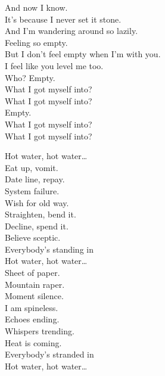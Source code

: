 And now I know. \\
It's because I never set it stone. \\
And I'm wandering around so lazily. \\
Feeling so empty. \\

But I don't feel empty when I'm with you. \\
I feel like you level me too. \\
Who? Empty. \\

What I got myself into? \\
What I got myself into? \\
Empty. \\

What I got myself into? \\
What I got myself into? \\





Hot water, hot water… \\

Eat up, vomit. \\
Date line, repay. \\
System failure. \\
Wish for old way. \\
Straighten, bend it. \\
Decline, spend it. \\
Believe sceptic. \\
Everybody's standing in \\

Hot water, hot water… \\

Sheet of paper. \\
Mountain raper. \\
Moment silence. \\
I am spineless. \\
Echoes ending. \\
Whispers trending. \\
Heat is coming. \\
Everybody's stranded in \\

Hot water, hot water… \\

